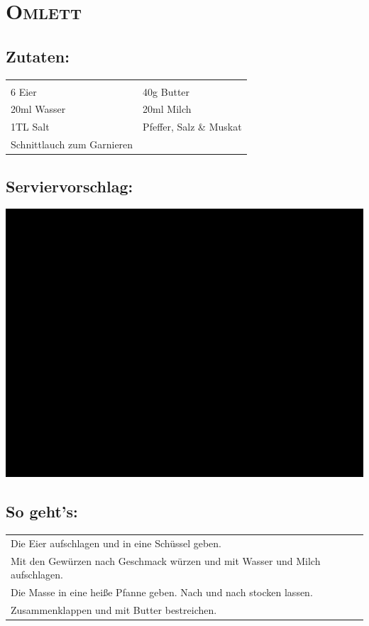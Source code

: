 \section{\textsc{Omlett}}

\subsection*{Zutaten:}

\begin{tabular}{p{7.5cm} p{7.5cm}}
	& \\
	6 Eier & 40g Butter \\
	20ml Wasser & 20ml Milch \\
  1TL Salt & Pfeffer, Salz \& Muskat \\
  Schnittlauch zum Garnieren &
\end{tabular}

\subsection*{Serviervorschlag:}

\includegraphics[width=\textwidth]{img/ph.jpg}

\subsection*{So geht's:}

\begin{tabular}{p{15cm}}
	\\
  Die Eier aufschlagen und in eine Schüssel geben.\\
  Mit den Gewürzen nach Geschmack würzen und mit Wasser und Milch aufschlagen. \\
  Die Masse in eine heiße Pfanne geben. Nach und nach stocken lassen.\\
  Zusammenklappen und mit Butter bestreichen. 
\end{tabular}
